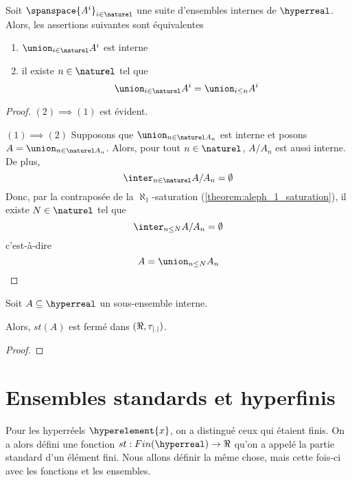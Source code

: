 \begin{corollary}
	Soit $\spanspace{A^{i}}_{i \in \naturel}$ une suite d'ensembles internes de
	$\hyperreal$.
	Alors, les assertions suivantes sont équivalentes
	\begin{enumerate}
		\item $\union_{i \in \naturel} A^{i}$ est interne
		\item il existe $n \in \naturel$ tel que
			\begin{equation}
				\union_{i \in \naturel} A^{i} = \union_{i \leq n} A^{i}
			\end{equation}
	\end{enumerate}
\end{corollary}

\ifdefined\outputproof
\begin{proof}
	$(2) \implies (1)$ est évident.

	$(1) \implies (2)$ Supposons que $\union_{n \in \naturel A_{n}}$ est
	interne et posons $A = \union_{n \in \naturel A_{n}}$. Alors, pour tout $n
	\in \naturel$, $A/A_{n}$ est aussi interne.
	De plus,
	\begin{equation}
		\inter_{n \in \naturel} A/A_{n} = \emptyset
	\end{equation}
	Donc, par la contraposée de la $\aleph_{1}$-saturation
	(\ref{theorem:aleph_1_saturation}), il existe $N \in \naturel$ tel que
	\begin{equation}
		\inter_{n \leq N} A/A_{n} = \emptyset
	\end{equation}
	c'est-à-dire
	\begin{equation}
		A = \union_{n \leq N} A_{n}
	\end{equation}
\end{proof}
\fi

\begin{proposition}
	Soit $A \subseteq \hyperreal$ un sous-ensemble interne.

	Alors, $st(A)$ est fermé dans $(\real, \tau_{\abs{.}})$.
\end{proposition}

\ifdefined\outputproof
\begin{proof}

\end{proof}
\fi

\section{Ensembles standards et hyperfinis}

Pour les hyperréels $\hyperelement{x}$, on a distingué ceux qui étaient finis. On a alors
défini une fonction $st : Fin(\hyperreal) \rightarrow \real$ qu'on a appelé la
partie standard d'un élément fini.
Nous allons définir la même chose, mais cette fois-ci avec les fonctions et les
ensembles.

